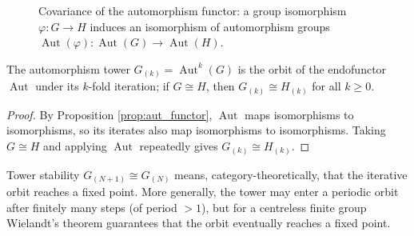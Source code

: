 \begin{figure}[htbp]
\centering
{}
\caption{Covariance of the automorphism functor: a group isomorphism $\varphi: G\to H$ induces an isomorphism of automorphism groups $\operatorname{Aut}(\varphi): \operatorname{Aut}(G)\to\operatorname{Aut}(H)$.}
\label{fig:aut_functor}
\end{figure}

\begin{corollary}\label{cor:tower_functor}
The automorphism tower $G_{(k)}=\operatorname{Aut}^k(G)$ is the orbit of the endofunctor $\operatorname{Aut}$ under its $k$-fold iteration; if $G\cong H$, then $G_{(k)}\cong H_{(k)}$ for all $k\ge 0$.
\end{corollary}

\begin{proof}
By Proposition \ref{prop:aut_functor}, $\operatorname{Aut}$ maps isomorphisms to isomorphisms, so its iterates also map isomorphisms to isomorphisms. Taking $G\cong H$ and applying $\operatorname{Aut}$ repeatedly gives $G_{(k)}\cong H_{(k)}$.
\end{proof}

\begin{remark}\label{rem:tower_fixed_point}
Tower stability $G_{(N+1)}\cong G_{(N)}$ means, category-theoretically, that the iterative orbit reaches a fixed point. More generally, the tower may enter a periodic orbit after finitely many steps (of period $>1$), but for a centreless finite group Wielandt's theorem guarantees that the orbit eventually reaches a fixed point.
\end{remark}

